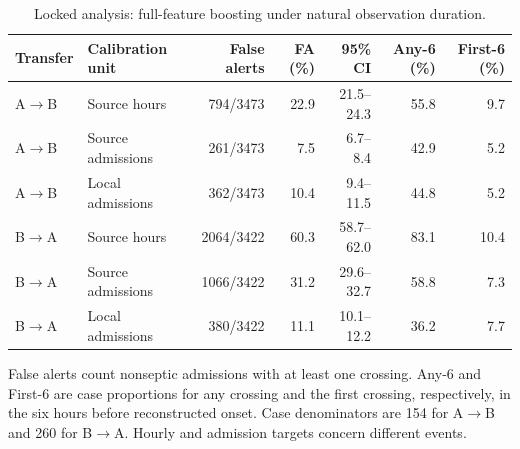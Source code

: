 \begin{table}[htbp]\centering\small
\caption{Locked analysis: full-feature boosting under natural observation duration.}\label{tab:transfer}
\begin{tabular}{llrrrrr}\toprule
Transfer & Calibration unit & False alerts & FA (\%) & 95\% CI & Any-6 (\%) & First-6 (\%) \\\midrule
A$\to$B & Source hours & 794/3473 & 22.9 & 21.5--24.3 & 55.8 & 9.7 \\
A$\to$B & Source admissions & 261/3473 & 7.5 & 6.7--8.4 & 42.9 & 5.2 \\
A$\to$B & Local admissions & 362/3473 & 10.4 & 9.4--11.5 & 44.8 & 5.2 \\
B$\to$A & Source hours & 2064/3422 & 60.3 & 58.7--62.0 & 83.1 & 10.4 \\
B$\to$A & Source admissions & 1066/3422 & 31.2 & 29.6--32.7 & 58.8 & 7.3 \\
B$\to$A & Local admissions & 380/3422 & 11.1 & 10.1--12.2 & 36.2 & 7.7 \\
\bottomrule\end{tabular}
\par\vspace{3pt}\begin{minipage}{.98\linewidth}\footnotesize False alerts count nonseptic admissions with at least one crossing. Any-6 and First-6 are case proportions for any crossing and the first crossing, respectively, in the six hours before reconstructed onset. Case denominators are 154 for A$\to$B and 260 for B$\to$A. Hourly and admission targets concern different events.\end{minipage}
\end{table}
